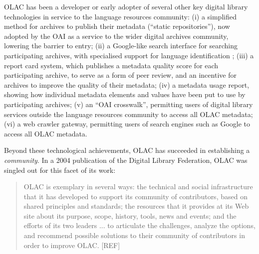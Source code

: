 
OLAC has been a developer or early adopter of several other key
digital library technologies in service to the language resources
community:
(i) a simplified method for archives to publish their metadata
  (``static repositories''), now adopted by the OAI as a service
  to the wider digital archives community, lowering the barrier to entry;
(ii) a Google-like search interface for searching participating
  archives, with specialised support for language identification
  \citep{HughesKamat05,Hughes06lrec};
(iii) a report card system, which publishes a metadata quality score
  for each participating archive, to serve as a form of
  peer review, and an incentive for archives to improve the quality of
  their metadata;
(iv) a metadata usage report, showing how individual metadata
  elements and values have been put to use by participating archives;
(v) an ``OAI crosswalk'', permitting users of digital library services
  outside the language resources community to access all OLAC metadata;
(vi) a web crawler gateway, permitting users of search engines such
  as Google to access all OLAC metadata.

Beyond these technological achievements, OLAC has succeeded in
establishing a \emph{community}.  In a 2004 publication of the
Digital Library Federation, OLAC was singled out for this
facet of its work:

\begin{quote}
  OLAC is exemplary in several ways: the technical and social
  infrastructure that it has developed to support its community of
  contributors, based on shared principles and standards; the
  resources that it provides at its Web site about its purpose, scope,
  history, tools, news and events; and the efforts of its two leaders
  ... to articulate the challenges, analyze the options, and recommend
  possible solutions to their community of contributors in order to
  improve OLAC.  [REF]
\end{quote}

\vspace{1in}


